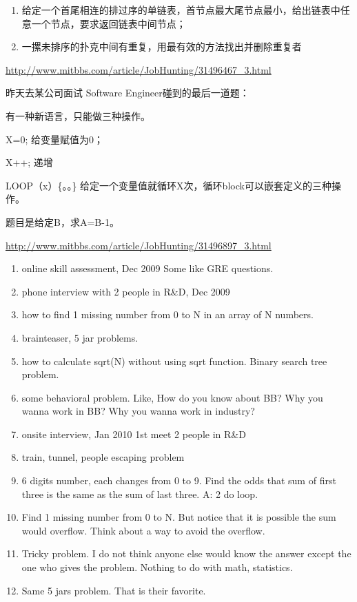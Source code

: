 \documentclass[12pt]{book}
\begin{document}
\begin{enumerate}
\item 给定一个首尾相连的排过序的单链表，首节点最大尾节点最小，给出链表中任意一个节点，要求返回链表中间节点；

\item 一摞未排序的扑克中间有重复，用最有效的方法找出并删除重复者
\end{enumerate}

\url{http://www.mitbbs.com/article/JobHunting/31496467_3.html}

昨天去某公司面试 Software Engineer碰到的最后一道题：

有一种新语言，只能做三种操作。

X=0;  给变量赋值为0；

X++;  递增

LOOP（x）\{。。\}   给定一个变量值就循环X次，循环block可以嵌套定义的三种操作。

题目是给定B，求A=B-1。

\url{http://www.mitbbs.com/article/JobHunting/31496897_3.html}

\begin{enumerate}
\item online skill assessment, Dec 2009 Some like GRE questions.
\item phone interview with 2 people in R\&D, Dec 2009
\item how to find 1 missing number from 0 to N in an array of N numbers.
\item brainteaser, 5 jar problems.
\item how to calculate sqrt(N) without using sqrt function. Binary search tree problem.
\item some behavioral problem. Like, How do you know about BB? Why you wanna work in BB? Why you wanna work in industry?
\item onsite interview, Jan 2010 1st meet 2 people in R\&D
\item train, tunnel, people escaping problem
\item 6 digits number, each changes from 0 to 9. Find the odds that sum
of first three is the same as the sum of last three. A: 2 do loop.
\item Find 1 missing number from 0 to N. But notice that it is possible
the sum would overflow. Think about a way to avoid the overflow.
\item Tricky problem. I do not think anyone else would know the answer except the one who gives the problem. Nothing to do with math, statistics.
\item Same 5 jars problem. That is their favorite.
\end{enumerate}
\end{document}
